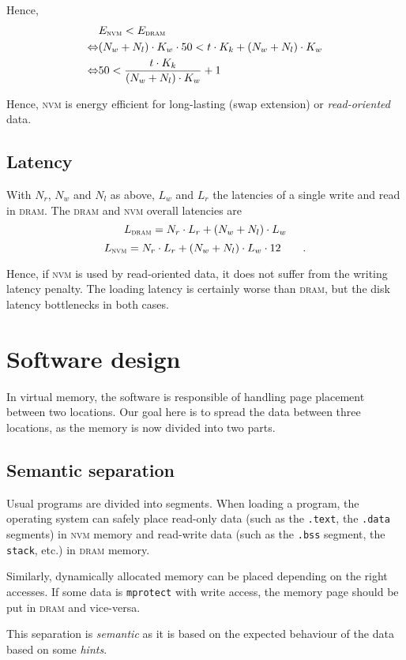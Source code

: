 \documentclass[twocolumn]{article}
\begin{document}
Hence,
\begin{align*}
	&E_{\textsc{nvm}} < E_{\textsc{dram}} \\
	\Leftrightarrow &(N_w + N_l)\cdot K_w\cdot 50 < t\cdot K_k  + (N_w+N_l)\cdot K_w \\
	\Leftrightarrow& 50 < \frac{t\cdot K_k}{(N_w + N_l)\cdot K_w} + 1
\end{align*}

Hence, \textsc{nvm} is energy efficient for long-lasting (swap extension) or \emph{read-oriented} data.

\subsection{Latency}
With $N_r$, $N_w$ and $N_l$ as above, $L_w$ and $L_r$ the latencies of a single write and read in \textsc{dram}.
The \textsc{dram} and \textsc{nvm} overall latencies are $$L_{\textsc{dram}} = N_r\cdot L_r + (N_w+ N_l)\cdot L_w$$ 
$$L_{\textsc{nvm}} = N_r\cdot L_r + (N_w + N_l)\cdot L_w\cdot 12\qquad .$$

Hence, if \textsc{nvm} is used by read-oriented data, it does not suffer from the writing latency penalty. The loading latency is certainly worse than \textsc{dram}, but the disk latency bottlenecks in both cases.

\section{Software design}
In virtual memory, the software is responsible of handling page placement between two locations. Our goal here is to spread the data between three locations, as the memory is now divided into two parts.

\subsection{Semantic separation}
Usual programs are divided into segments. When loading a program, the operating system can safely place read-only data (such as the \texttt{.text}, the \texttt{.data} segments) in \textsc{nvm} memory and read-write data (such as the \texttt{.bss} segment, the \texttt{stack}, etc.) in \textsc{dram} memory.

Similarly, dynamically allocated memory can be placed depending on the right accesses. If some data is \texttt{mprotect} with write access, the memory page should be put in \textsc{dram} and vice-versa.

This separation is \emph{semantic} as it is based on the expected behaviour of the data based on some \emph{hints}.
\end{document}
